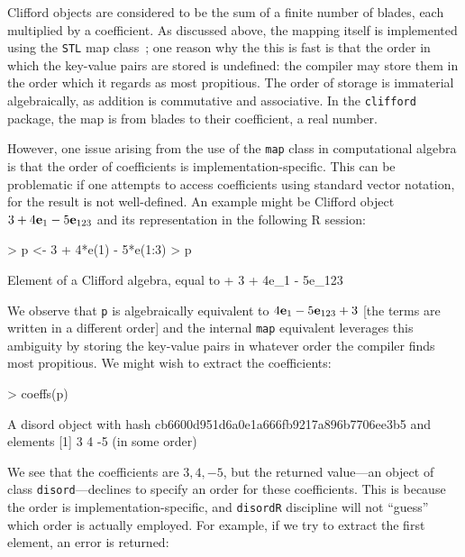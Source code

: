 \documentclass{birkjour}
\theoremstyle{definition}
\theoremstyle{remark}
\numberwithin{equation}{section}
\begin{document}
Clifford objects are considered to be the sum of a finite number of
blades, each multiplied by a coefficient.  As discussed above, the
mapping itself is implemented using the {\tt STL} map
class~\cite{musser2009}; one reason why the this is fast is that the
order in which the key-value pairs are stored is undefined: the
compiler may store them in the order which it regards as most
propitious.  The order of storage is immaterial algebraically, as
addition is commutative and associative.  In the {\tt clifford}
package, the map is from blades to their coefficient, a real number.

However, one issue arising from the use of the {\tt map} class in
computational algebra is that the order of coefficients is
implementation-specific.  This can be problematic if one attempts to
access coefficients using standard vector notation, for the result is
not well-defined.  An example might be Clifford object
$3+4{\bf e}_{1}-5{\bf e}_{123}$ and its representation in the following R
session:

\begin{Schunk}
\begin{Sinput}
> p <- 3 + 4*e(1) - 5*e(1:3)
> p
\end{Sinput}
\begin{Soutput}
Element of a Clifford algebra, equal to
+ 3 + 4e_1 - 5e_123
\end{Soutput}
\end{Schunk}

We observe that {\tt p} is algebraically equivalent to
$4{\bf e}_{1}-5{\bf e}_{123}+3$ [the terms are written in a different order] and
the internal {\tt map} equivalent leverages this ambiguity by storing
the key-value pairs in whatever order the compiler finds most
propitious.  We might wish to extract the coefficients:

\begin{Schunk}
\begin{Sinput}
> coeffs(p)
\end{Sinput}
\begin{Soutput}
  A disord object with hash cb6600d951d6a0e1a666fb9217a896b7706ee3b5 and elements
[1]  3  4 -5
(in some order)
\end{Soutput}
\end{Schunk}

We see that the coefficients are $3,4,-5$, but the returned value---an
object of class {\tt disord}---declines to specify an order for these
coefficients.  This is because the order is implementation-specific,
and {\tt disordR} discipline will not ``guess'' which order is
actually employed.  For example, if we try to extract the first
element, an error is returned:
\end{document}

